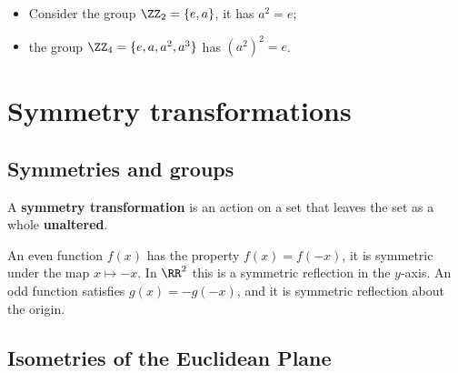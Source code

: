 \documentclass[12pt, a4paper]{article}
\begin{document}
\begin{example}
    \hphantom{This is to make it look nice}
    \begin{itemize}
        \item Consider the group \(\ZZ_2 = \{e,a\}\), it has \(a^2=e\);
        \item the group \(\ZZ_4 = \{e,a,a^2,a^3\}\) has \((a^2)^2=e\).
    \end{itemize}
\end{example}

\pagebreak

\section{Symmetry transformations}

\subsection{Symmetries and groups}

\begin{definition}
    A \textbf{symmetry transformation} is an action on a set that leaves the set as a whole \textbf{unaltered}.
\end{definition}




\begin{mdnote}
    An even function \(f(x)\) has the property \(f(x)=f(-x)\), it is symmetric under the map \(x \mapsto -x\). In \(\RR^2\) this is a symmetric reflection in the \(y\)-axis. An odd function satisfies \(g(x)=-g(-x)\), and it is symmetric reflection about the origin.
\end{mdnote}

\subsection{Isometries of the Euclidean Plane}
\end{document}
